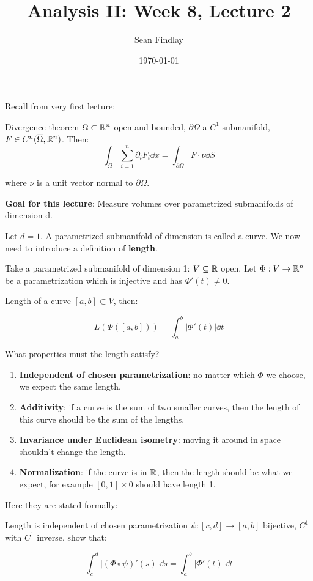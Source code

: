 \documentclass[12pt]{article}
\title{Analysis II: Week 8, Lecture 2}
\author{Sean Findlay}
\date{\today}
\begin{document}
\maketitle
Recall from very first lecture:
\begin{theorem}{Divergence theorem}{}
    $\Omega \subset \mathbb{R}^n$ open and bounded, $\partial \Omega$ a $C^1$ submanifold, $F \in C^n(\overline{\Omega}, \mathbb{R}^n)$. Then:
    $$
        \int_{\Omega} \sum_{i = 1}^{n} \partial_i F_i \dd x = \int_{\partial \Omega} F \cdot \nu \dd S
    $$

    where $\nu$ is a unit vector normal to $\partial \Omega$.
\end{theorem}

\textbf{Goal for this lecture}: Measure volumes over parametrized submanifolds of dimension d.

Let $d = 1$. A parametrized submanifold of dimension is called a curve. We now need to introduce a definition of \textbf{length}.

Take a parametrized submanifold of dimension 1: $V \subseteq \mathbb{R}$ open. Let $\Phi: V \rightarrow \mathbb{R}^n$ be a parametrization which is injective and has $\Phi'(t) \neq 0$.

\begin{definition}{Length of a curve}{}
    $[a, b] \subset V$, then:

    $$
        L(\Phi([a, b])) = \int_{a}^{b} \left|\Phi'(t)\right| \dd t
    $$
\end{definition}

What properties must the length satisfy?

\begin{enumerate}
    \item \textbf{Independent of chosen parametrization}: no matter which $\Phi$ we choose, we expect the same length.
    \item \textbf{Additivity}: if a curve is the sum of two smaller curves, then the length of this curve should be the sum of the lengths.
    \item \textbf{Invariance under Euclidean isometry}: moving it around in space shouldn't change the length.
    \item \textbf{Normalization}: if the curve is in $\mathbb{R}$, then the length should be what we expect, for example $[0, 1] \times {0}$ should have length 1.
\end{enumerate}

Here they are stated formally:

\begin{exercise}{Length is independent of chosen parametrization}{}
    $\psi: [c, d] \rightarrow [a, b]$ bijective, $C^1$ with $C^1$ inverse, show that:

$$
    \int_{c}^{d} \left|(\Phi \circ \psi)'(s)\right|\dd s = \int_{a}^{b} \left|\Phi'(t)\right| \dd t
$$
\end{exercise}
\end{document}
